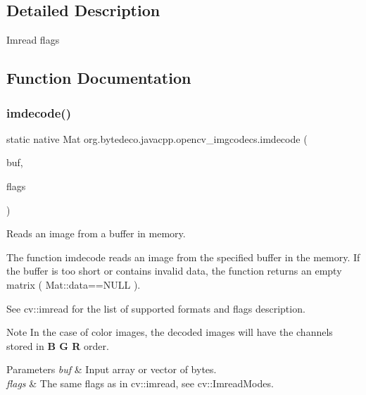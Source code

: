 \subsection{Detailed Description}
Imread flags 

\subsection{Function Documentation}
\mbox{\label{group__imgcodecs_gac13b3cea648e84cd2ead3c4849023497}} 
\subsubsection{\texorpdfstring{imdecode()}{imdecode()}\hspace{0.1cm}{\footnotesize\ttfamily [1/2]}}
{\footnotesize\ttfamily static native Mat org.\+bytedeco.\+javacpp.\+opencv\+\_\+imgcodecs.\+imdecode (\begin{DoxyParamCaption}\item[{@By\+Val Mat}]{buf,  }\item[{int}]{flags }\end{DoxyParamCaption})\hspace{0.3cm}{\ttfamily [static]}}



Reads an image from a buffer in memory. 

The function imdecode reads an image from the specified buffer in the memory. If the buffer is too short or contains invalid data, the function returns an empty matrix ( Mat\+::data==N\+U\+LL ). 

See cv\+::imread for the list of supported formats and flags description. 

\begin{DoxyNote}{Note}
In the case of color images, the decoded images will have the channels stored in {\bfseries B G R} order. 
\end{DoxyNote}

\begin{DoxyParams}{Parameters}
{\em buf} & Input array or vector of bytes. \\
\hline
{\em flags} & The same flags as in cv\+::imread, see cv\+::\+Imread\+Modes. \\
\hline
\end{DoxyParams}
\mbox{\label{group__imgcodecs_gaf794fdf6c3f9d68b53c283bc7ee3d8ef}} 
